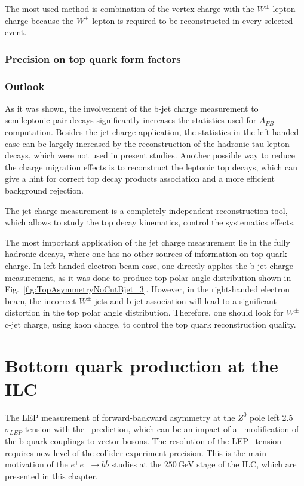 The most used method is combination of the vertex charge with the $W^\pm$ lepton charge because the $W^\pm$ lepton is required to be reconstructed in every selected event. 
\subsubsection{Precision on top quark form factors }

\subsubsection{Outlook}
As it was shown, the involvement of the b-jet charge measurement to semileptonic \ttbar pair decays significantly increases the statistics used for $A_{FB}$ computation.
Besides the jet charge application, the statistics in the left-handed case can be largely increased by the reconstruction of the hadronic tau lepton decays, which were not used in present studies. 
Another possible way to reduce the charge migration effects is to reconstruct the leptonic top decays, which can give a hint for correct top decay products association and a more efficient background rejection.

The jet charge measurement is a completely independent reconstruction tool, which allows to study the top decay kinematics, control the systematics effects.

The most important application of the jet charge measurement lie in the fully hadronic \ttbar decays, where one has no other sources of information on top quark charge. 
In left-handed electron beam case, one directly applies the b-jet charge measurement, as it was done to produce top polar angle distribution shown in Fig.~\ref{fig:TopAsymmetryNoCutBjet_3}. 
However, in the right-handed electron beam, the incorrect $W^\pm$ jets and b-jet association will lead to a significant distortion in the top polar angle distribution. Therefore, one should look for $W^\pm$ c-jet charge, using kaon charge, to control the top quark reconstruction quality. 


\section{Bottom quark production at the ILC}
The LEP measurement of forward-backward asymmetry at the $Z^0$ pole left 2.5$\sigma_{LEP}$ tension with the \sm\ prediction, which can be an impact of a \bsm\ modification of the b-quark couplings to vector bosons.
The resolution of the LEP \afbb\ tension requires new level of the collider experiment precision.
This is the main motivation of the $e^+e^-\to b\bar{b}$ studies at the $250$\,GeV stage of the ILC, which are presented in this chapter. 

